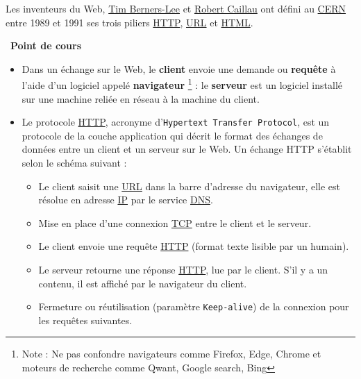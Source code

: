 \documentclass[
  11pt,
]{article}
\newcommand{\passthrough}[1]{#1}
\providecommand{\tightlist}{%
  \setlength{\itemsep}{0pt}\setlength{\parskip}{0pt}}
\newcounter{cours}
\newenvironment{cours}[1]
{\par \medskip   \addtocounter{cours}{1} \noindent  
\begin{bclogo}[arrondi =0.1,  ombre = true, barre=none, logo=\bcbook, marge=4]{~\textbf{Point de cours} \textbf{\thecours} {\itshape #1} }  \par}
{
\end{bclogo}
 \par \bigskip }
\newcounter{logi}
\begin{document}
Les inventeurs du Web,
\href{https://interstices.info/les-debuts-du-web-sous-loeil-du-w3c/}{Tim
Berners-Lee} et
\href{https://fr.wikipedia.org/wiki/Robert_Cailliau}{Robert Caillau} ont
défini au
\href{https://fr.wikipedia.org/wiki/Organisation_europ\%C3\%A9enne_pour_la_recherche_nucl\%C3\%A9aire}{CERN}
entre 1989 et 1991 ses trois piliers
\href{https://developer.mozilla.org/fr/docs/Glossaire/HTTP}{HTTP},
\url{URL} et \url{HTML}.

\begin{cours}{}

\begin{itemize}
\tightlist
\item
  Dans un échange sur le Web, le \textbf{client} envoie une demande ou
  \textbf{requête} à l'aide d'un logiciel appelé \textbf{navigateur}
  \footnote{Note : Ne pas confondre navigateurs comme Firefox, Edge,
    Chrome et moteurs de recherche comme Qwant, Google search, Bing} :
  le \textbf{serveur} est un logiciel installé sur une machine reliée en
  réseau à la machine du client.
\item
  Le protocole
  \href{https://developer.mozilla.org/fr/docs/Glossaire/HTTP}{HTTP},
  acronyme d'\passthrough{\lstinline!Hypertext Transfer Protocol!}, est
  un protocole de la couche application qui décrit le format des
  échanges de données entre un client et un serveur sur le Web. Un
  échange HTTP s'établit selon le schéma suivant :

  \begin{itemize}
  \tightlist
  \item
    Le client saisit une
    \href{https://developer.mozilla.org/fr/docs/Glossaire/URL}{URL} dans
    la barre d'adresse du navigateur, elle est résolue en adresse
    \href{https://developer.mozilla.org/fr/docs/Glossaire/IP_Address}{IP}
    par le service
    \href{https://developer.mozilla.org/fr/docs/Glossaire/DNS}{DNS}.
  \item
    Mise en place d'une connexion \url{TCP} entre le client et le
    serveur.
  \item
    Le client envoie une requête
    \href{https://developer.mozilla.org/fr/docs/Glossaire/HTTP}{HTTP}
    (format texte lisible par un humain).
  \item
    Le serveur retourne une réponse
    \href{https://developer.mozilla.org/fr/docs/Glossaire/HTTP}{HTTP},
    lue par le client. S'il y a un contenu, il est affiché par le
    navigateur du client.
  \item
    Fermeture ou réutilisation (paramètre
    \passthrough{\lstinline!Keep-alive!}) de la connexion pour les
    requêtes suivantes.
  \end{itemize}
\end{itemize}


\end{cours}
\end{document}
